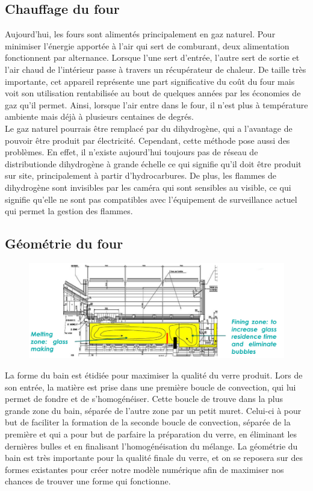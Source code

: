 \documentclass[12pt, a4paper, french, BCOR = 0pt, DIV = 10]{scrartcl}
\begin{document}
    \subsection{Chauffage du four}
    Aujourd'hui, les fours sont alimentés principalement en gaz naturel. Pour minimiser l'énergie apportée à l'air qui sert de comburant, deux alimentation fonctionnent par alternance. Lorsque l'une sert d'entrée, l'autre sert de sortie et l'air chaud de l'intérieur passe à travers un récupérateur de chaleur. De taille très importante, cet appareil représente une part significative du coût du four mais voit son utilisation rentabilisée au bout de quelques années par les économies de gaz qu'il permet. Ainsi, lorsque l'air entre dans le four, il n'est plus à température ambiente mais déjà à plusieurs centaines de degrés.\\
    Le gaz naturel pourrais être remplacé par du dihydrogène, qui a l'avantage de pouvoir être produit par électricité. Cependant, cette méthode pose aussi des problèmes. En effet, il n'existe aujourd'hui toujours pas de réseau de distributionde dihydrogène à grande échelle ce qui signifie qu'il doit être produit sur site, principalement à partir d'hydrocarbures. De plus, les flammes de dihydrogène sont invisibles par les caméra qui sont sensibles au visible, ce qui signifie qu'elle ne sont pas compatibles avec l'équipement de surveillance actuel qui permet la gestion des flammes.

    \subsection{Géométrie du four}
    \begin{center}
        \begin{figure}[h]
            \includegraphics[width=\linewidth]{VueEnCoupe.png}
        \end{figure}
    \end{center}
    La forme du bain est étidiée pour maximiser la qualité du verre produit. Lors de son entrée, la matière est prise dans une première boucle de convection, qui lui permet de fondre et de s'homogénéiser. Cette boucle de trouve dans la plus grande zone du bain, séparée de l'autre zone par un petit muret. Celui-ci à pour but de faciliter la formation de la seconde boucle de convection, séparée de la première et qui a pour but de parfaire la préparation du verre, en éliminant les dernières bulles et en finalisant l'homogénéisation du mélange. La géométrie du bain est très importante pour la qualité finale du verre, et on se reposera sur des formes existantes pour créer notre modèle numérique afin de maximiser nos chances de trouver une forme qui fonctionne.
\end{document}
